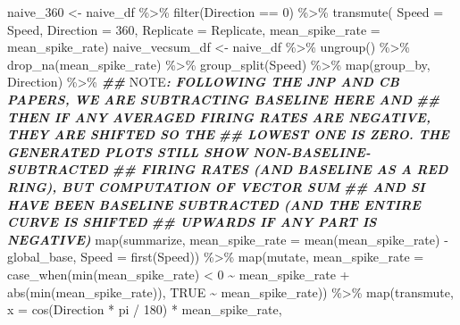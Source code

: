 \documentclass[
]{book}
\newenvironment{Shaded}{\begin{snugshade}}{\end{snugshade}}
\newcommand{\AlertTok}[1]{\textcolor[rgb]{0.94,0.16,0.16}{#1}}
\newcommand{\AttributeTok}[1]{\textcolor[rgb]{0.77,0.63,0.00}{#1}}
\newcommand{\ConstantTok}[1]{\textcolor[rgb]{0.00,0.00,0.00}{#1}}
\newcommand{\DecValTok}[1]{\textcolor[rgb]{0.00,0.00,0.81}{#1}}
\newcommand{\DocumentationTok}[1]{\textcolor[rgb]{0.56,0.35,0.01}{\textbf{\textit{#1}}}}
\newcommand{\FunctionTok}[1]{\textcolor[rgb]{0.00,0.00,0.00}{#1}}
\newcommand{\NormalTok}[1]{#1}
\newcommand{\OtherTok}[1]{\textcolor[rgb]{0.56,0.35,0.01}{#1}}
\newcommand{\SpecialCharTok}[1]{\textcolor[rgb]{0.00,0.00,0.00}{#1}}
\begin{document}
\begin{Shaded}
\begin{Highlighting}[]
\NormalTok{naive\_360 }\OtherTok{\textless{}{-}}
\NormalTok{  naive\_df }\SpecialCharTok{\%\textgreater{}\%}
  \FunctionTok{filter}\NormalTok{(Direction }\SpecialCharTok{==} \DecValTok{0}\NormalTok{) }\SpecialCharTok{\%\textgreater{}\%}
  \FunctionTok{transmute}\NormalTok{(}
    \AttributeTok{Speed =}\NormalTok{ Speed,}
    \AttributeTok{Direction =} \DecValTok{360}\NormalTok{,}
    \AttributeTok{Replicate =}\NormalTok{ Replicate,}
    \AttributeTok{mean\_spike\_rate =}\NormalTok{ mean\_spike\_rate)}
\NormalTok{naive\_vecsum\_df }\OtherTok{\textless{}{-}}
\NormalTok{  naive\_df }\SpecialCharTok{\%\textgreater{}\%}
  \FunctionTok{ungroup}\NormalTok{() }\SpecialCharTok{\%\textgreater{}\%}
  \FunctionTok{drop\_na}\NormalTok{(mean\_spike\_rate) }\SpecialCharTok{\%\textgreater{}\%}
  \FunctionTok{group\_split}\NormalTok{(Speed) }\SpecialCharTok{\%\textgreater{}\%}
  \FunctionTok{map}\NormalTok{(group\_by, Direction) }\SpecialCharTok{\%\textgreater{}\%}
  \DocumentationTok{\#\# }\AlertTok{NOTE}\DocumentationTok{: FOLLOWING THE JNP AND CB PAPERS, WE ARE SUBTRACTING BASELINE HERE AND}
  \DocumentationTok{\#\# THEN IF ANY AVERAGED FIRING RATES ARE NEGATIVE, THEY ARE SHIFTED SO THE}
  \DocumentationTok{\#\# LOWEST ONE IS ZERO. THE GENERATED PLOTS STILL SHOW NON{-}BASELINE{-}SUBTRACTED}
  \DocumentationTok{\#\# FIRING RATES (AND BASELINE AS A RED RING), BUT COMPUTATION OF VECTOR SUM}
  \DocumentationTok{\#\# AND SI HAVE BEEN BASELINE SUBTRACTED (AND THE ENTIRE CURVE IS SHIFTED}
  \DocumentationTok{\#\# UPWARDS IF ANY PART IS NEGATIVE)}
  \FunctionTok{map}\NormalTok{(summarize,}
      \AttributeTok{mean\_spike\_rate =} \FunctionTok{mean}\NormalTok{(mean\_spike\_rate) }\SpecialCharTok{{-}}\NormalTok{ global\_base,}
      \AttributeTok{Speed =} \FunctionTok{first}\NormalTok{(Speed)) }\SpecialCharTok{\%\textgreater{}\%}
  \FunctionTok{map}\NormalTok{(mutate,}
      \AttributeTok{mean\_spike\_rate =}
        \FunctionTok{case\_when}\NormalTok{(}\FunctionTok{min}\NormalTok{(mean\_spike\_rate) }\SpecialCharTok{\textless{}} \DecValTok{0} \SpecialCharTok{\textasciitilde{}}\NormalTok{ mean\_spike\_rate }\SpecialCharTok{+} \FunctionTok{abs}\NormalTok{(}\FunctionTok{min}\NormalTok{(mean\_spike\_rate)),}
                  \ConstantTok{TRUE} \SpecialCharTok{\textasciitilde{}}\NormalTok{ mean\_spike\_rate)) }\SpecialCharTok{\%\textgreater{}\%}
  \FunctionTok{map}\NormalTok{(transmute,}
      \AttributeTok{x =} \FunctionTok{cos}\NormalTok{(Direction }\SpecialCharTok{*}\NormalTok{ pi }\SpecialCharTok{/} \DecValTok{180}\NormalTok{) }\SpecialCharTok{*}\NormalTok{ mean\_spike\_rate,}

\end{Highlighting}
\end{Shaded}
\end{document}
